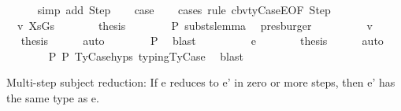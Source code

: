 \begin{isabellebody}
\ \ \ \ \isamarkupfalse%
\ {\isacharparenleft}{\kern0pt}simp\ add{\isacharcolon}{\kern0pt}\ Step{\isacharparenright}{\kern0pt}\isanewline
\isanewline
\ \ \isamarkupfalse%
\ {\isacharquery}{\kern0pt}case\isanewline
\ \ \isamarkupfalse%
\ {\isacharparenleft}{\kern0pt}cases\ rule{\isacharcolon}{\kern0pt}\ cbv{\isacharunderscore}{\kern0pt}ty{\isacharunderscore}{\kern0pt}CaseE{\isacharbrackleft}{\kern0pt}OF\ Step{\isacharbrackright}{\kern0pt}{\isacharparenright}{\kern0pt}\isanewline
\ \ \ \ \isamarkupfalse%
\ {\isacharparenleft}{\kern0pt}{}\ v\ XsGs{\isacharparenright}{\kern0pt}\isanewline
\ \ \ \ \isamarkupfalse%
\ \isamarkupfalse%
\ {\isacharquery}{\kern0pt}thesis\isanewline
\ \ \ \ \ \ \isamarkupfalse%
\ P{}\ substs{\isacharunderscore}{\kern0pt}lemma\ \isamarkupfalse%
\ presburger\isanewline
\ \ \isamarkupfalse%
\isanewline
\ \ \ \ \isamarkupfalse%
\ {\isacharparenleft}{\kern0pt}{}\ v{\isacharparenright}{\kern0pt}\isanewline
\ \ \ \ \isamarkupfalse%
\ \isamarkupfalse%
\ {\isacharquery}{\kern0pt}thesis\isanewline
\ \ \ \ \isamarkupfalse%
\ auto\isanewline
\ \ \ \ \ \ \isamarkupfalse%
\ P{}\ \isamarkupfalse%
\ blast\isanewline
\ \ \isamarkupfalse%
\isanewline
\ \ \ \ \isamarkupfalse%
\ {\isacharparenleft}{\kern0pt}{}\ e{}{\isacharprime}{\kern0pt}{\isacharparenright}{\kern0pt}\isanewline
\ \ \ \ \isamarkupfalse%
\ \isamarkupfalse%
\ {\isacharquery}{\kern0pt}thesis\isanewline
\ \ \ \ \isamarkupfalse%
\ auto\isanewline
\ \ \ \ \ \ \isamarkupfalse%
\ P{}\ P{}\ TyCase{\isachardot}{\kern0pt}hyps{\isacharparenleft}{\kern0pt}{}{\isacharparenright}{\kern0pt}\ typing{\isachardot}{\kern0pt}TyCase\ \isamarkupfalse%
\ blast\isanewline
\ \ \isamarkupfalse%
\isanewline
{}\isamarkupfalse%
%
\endisatagproof
{\isafoldproof}%
%
\isadelimproof
%
\endisadelimproof
%
\begin{isamarkuptext}%
Multi-step subject reduction:
  If e reduces to e' in zero or more steps,
  then e' has the same type as e.%
\end{isamarkuptext}\isamarkuptrue%

\end{isabellebody}
